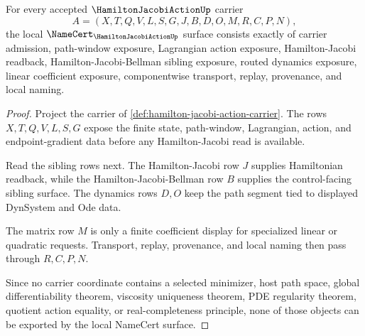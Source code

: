 \begin{theorem}
\label{thm:hamilton-jacobi-action-namecert-obligations}
For every accepted $\HamiltonJacobiActionUp$ carrier
$$
A=(X,T,Q,V,L,S,G,J,B,D,O,M,R,C,P,N),
$$
the local $\NameCert_{\HamiltonJacobiActionUp}$ surface consists exactly of carrier admission, path-window exposure, Lagrangian action exposure, Hamilton-Jacobi readback, Hamilton-Jacobi-Bellman sibling exposure, routed dynamics exposure, linear coefficient exposure, componentwise transport, replay, provenance, and local naming.
\end{theorem}
\begin{proof}
Project the carrier of \autoref{def:hamilton-jacobi-action-carrier}. The rows $X,T,Q,V,L,S,G$ expose the finite state, path-window, Lagrangian, action, and endpoint-gradient data before any Hamilton-Jacobi read is available.

Read the sibling rows next. The Hamilton-Jacobi row $J$ supplies Hamiltonian readback, while the Hamilton-Jacobi-Bellman row $B$ supplies the control-facing sibling surface. The dynamics rows $D,O$ keep the path segment tied to displayed DynSystem and Ode data.

The matrix row $M$ is only a finite coefficient display for specialized linear or quadratic requests. Transport, replay, provenance, and local naming then pass through $R,C,P,N$.

Since no carrier coordinate contains a selected minimizer, host path space, global differentiability theorem, viscosity uniqueness theorem, PDE regularity theorem, quotient action equality, or real-completeness principle, none of those objects can be exported by the local NameCert surface.
\end{proof}

